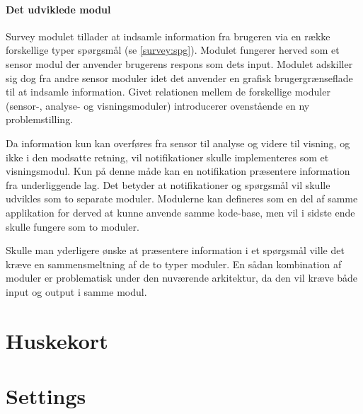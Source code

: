 \paragraph{Det udviklede modul}
Survey modulet tillader at indsamle information fra brugeren via en række forskellige typer spørgsmål (se \cref{survey:spg}).
Modulet fungerer herved som et sensor modul der anvender brugerens respons som dets input.
Modulet adskiller sig dog fra andre sensor moduler idet det anvender en grafisk brugergrænseflade til at indsamle information.
Givet relationen mellem de forskellige moduler (sensor-, analyse- og visningsmoduler) introducerer ovenstående en ny problemstilling.

Da information kun kan overføres fra sensor til analyse og videre til visning, og ikke i den modsatte retning, vil notifikationer skulle implementeres som et visningsmodul.
Kun på denne måde kan en notifikation præsentere information fra underliggende lag.
Det betyder at notifikationer og spørgsmål vil skulle udvikles som to separate moduler.
Modulerne kan defineres som en del af samme applikation for derved at kunne anvende samme kode-base, men vil i sidste ende skulle fungere som to moduler.

Skulle man yderligere ønske at præsentere information i et spørgsmål ville det kræve en sammensmeltning af de to typer moduler.
En sådan kombination af moduler er problematisk under den nuværende arkitektur, da den vil kræve både input og output i samme modul.

\section{Huskekort}

\section{Settings}
